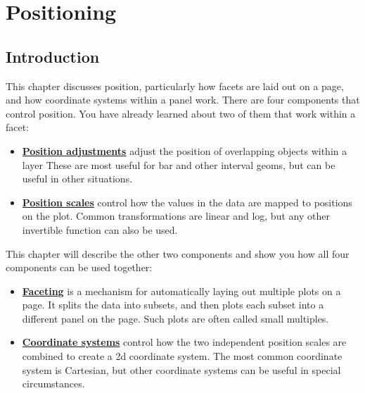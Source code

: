 \chapter{Positioning}\label{cha:position}

\section{Introduction}

This chapter discusses position, particularly how facets are laid out on
a page, and how coordinate systems within a panel work. There are four
components that control position. You have already learned about two of
them that work within a facet: 

\begin{itemize}
\itemsep1pt\parskip0pt
\item
  \hyperref[sec:position]{\textbf{Position adjustments}} adjust the
  position of overlapping objects within a layer These are most useful
  for bar and other interval geoms, but can be useful in other
  situations.
\item
  \hyperref[sub:scale-position]{\textbf{Position scales}} control how
  the values in the data are mapped to positions on the plot. Common
  transformations are linear and log, but any other invertible function
  can also be used.
\end{itemize}

\noindent This chapter will describe the other two components and show
you how all four components can be used together:

\begin{itemize}
\itemsep1pt\parskip0pt
\item
  \hyperref[sec:faceting]{\textbf{Faceting}} is a mechanism for
  automatically laying out multiple plots on a page. It splits the data
  into subsets, and then plots each subset into a different panel on the
  page. Such plots are often called small multiples.\\
\item
  \hyperref[sec:coord]{\textbf{Coordinate systems}} control how the two
  independent position scales are combined to create a 2d coordinate
  system. The most common coordinate system is Cartesian, but other
  coordinate systems can be useful in special circumstances.
\end{itemize}


